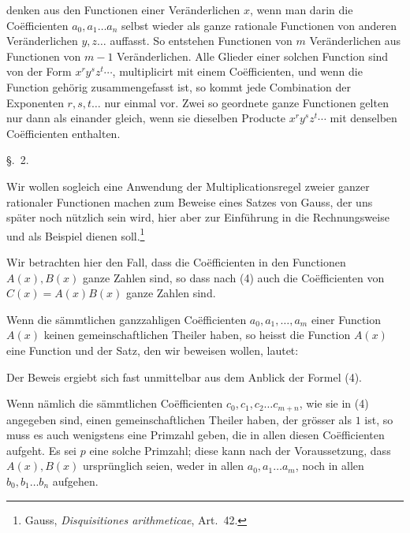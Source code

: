 denken aus den Functionen einer Veränderlichen $x$, wenn man darin die
Coëfficienten $a_0,a_1\ldots a_n$ selbst wieder als ganze rationale
Functionen von anderen Veränderlichen $y,z\ldots$ auffasst. So
entstehen Functionen von $m$ Veränderlichen aus Functionen von $m-1$
Veränderlichen. Alle Glieder einer solchen Function sind von der Form
$x^r y^s z^t\cdots$, multiplicirt mit einem Coëfficienten, und wenn die
Function gehörig zusammengefasst ist, so kommt jede Combination der
Exponenten $r,s,t\ldots$ nur einmal vor. Zwei so geordnete ganze
Functionen gelten nur dann als einander gleich, wenn sie dieselben
Producte $x^r y^s z^t\cdots$ mit denselben Coëfficienten enthalten.

\begin{center}
{\large \S.\ 2.}

\vspace{0.5em}
{\large{}}
\end{center}

Wir wollen sogleich eine Anwendung der Multiplicationsregel zweier
ganzer rationaler Functionen machen zum Beweise eines Satzes von
Gauss, der uns später noch nützlich sein wird, hier aber zur Einführung
in die Rechnungsweise und als Beispiel dienen soll.\footnote{Gauss,
\emph{Disquisitiones arithmeticae}, Art.~42.}

Wir betrachten hier den Fall, dass die Coëfficienten in den Functionen
$A(x),B(x)$ ganze Zahlen sind, so dass nach (4) auch die Coëfficienten
von $C(x)=A(x)B(x)$ ganze Zahlen sind.

Wenn die sämmtlichen ganzzahligen Coëfficienten
$a_0,a_1,\ldots,a_m$ einer Function $A(x)$ keinen gemeinschaftlichen
Theiler haben, so heisst die Function $A(x)$ eine
 Function und der Satz, den wir
beweisen wollen, lautet:


Der Beweis ergiebt sich fast unmittelbar aus dem Anblick der Formel
(4).

Wenn nämlich die sämmtlichen Coëfficienten
$c_0,c_1,c_2\ldots c_{m+n}$, wie sie in (4) angegeben sind, einen
gemeinschaftlichen Theiler haben, der grösser als $1$ ist, so muss es
auch wenigstens eine Primzahl geben, die in allen diesen Coëfficienten
aufgeht. Es sei $p$ eine solche Primzahl; diese kann nach der
Voraussetzung, dass $A(x),B(x)$ ursprünglich seien, weder in allen
$a_0,a_1\ldots a_m$, noch in allen $b_0,b_1\ldots b_n$ aufgehen.
